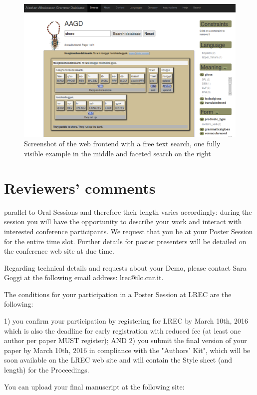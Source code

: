 \documentclass[10pt, a4paper]{article}
\begin{document}
\begin{figure}[t]
\includegraphics[width=\textwidth]{aagd.png}
\caption{Screenshot of the web frontend with a free text search, one fully visible example in the middle and faceted search on the right}
\end{figure}

\section{Reviewers' comments}
 parallel to Oral Sessions and therefore their length varies accordingly: during the session you will have the opportunity to describe your work and interact with interested conference participants. We request that you be at your Poster Session for the entire time slot. Further details for poster presenters will be detailed on the conference web site at due time.

Regarding technical details and requests about your Demo, please contact Sara Goggi at the following email address: lrec@ilc.cnr.it.

The conditions for your participation in a Poster Session at LREC are the following:

1) you confirm your participation by registering for LREC by March 10th, 2016 which is also the deadline for early registration with reduced fee (at least one author per paper MUST register);
AND
2) you submit the final version of your paper by March 10th, 2016 in compliance with the "Authors' Kit", which will be soon available on the LREC web site and will contain the Style sheet (and length) for the Proceedings.


You can upload your final manuscript at the following site:
\end{document}

